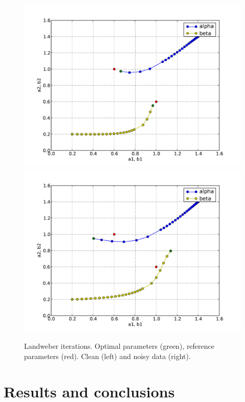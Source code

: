 \begin{figure}
  \centering
  \includegraphics[width=\twofigs]{chapters/schroll/pdf/4D-1scan4b.pdf}
  \includegraphics[width=\twofigs]{chapters/schroll/pdf/4D-1scan4b-5.pdf}
  \caption{Landweber iterations. Optimal parameters (green), reference
    parameters (red). Clean (left) and noisy data (right).}
  \label{fig6}
\end{figure}

\section{Results and conclusions}

